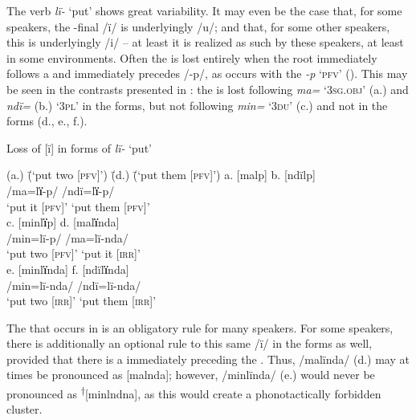   The verb \textit{lï-} ‘put’ shows great variability. It may even be the case that, for some speakers, the -final  /ï/ is underlyingly /u/; and that, for some other speakers, this  is underlyingly /i/ -- at least it is realized as such by these speakers, at least in some environments. Often the  is lost entirely when the root immediately follows a  and immediately precedes /-p/, as occurs with the   \textit{-p} ‘\textsc{pfv}’ (). This may be seen in the contrasts presented in : the  is lost following \textit{ma=} ‘3\textsc{sg.obj}’ (a.) and \textit{ndï=} (b.) ‘3\textsc{pl}’ in the  forms, but not following \textit{min=} ‘\textsc{3du}’ (c.) and not in the  forms (d., e., f.).

\ea%
    \label{ex:phon:91}
          Loss of [ï] in  forms of \textit{lï-} ‘put’\\
\begin{tabbing}
{(a.)} \= {(‘put two [\textsc{pfv]}’)} \= {(d.)} \= {(‘put them [\textsc{pfv]}’)}\kill
{a.} \> {[malp]} \> {b.} \> {[ndïlp]}\\
{ } \> {/ma=l\textbf{ï}-p/ } \> { } \> {/ndï=l\textbf{ï}-p/ }\\
{ } \> {‘put it [\textsc{pfv]}’} \> { } \> {‘put them [\textsc{pfv]}’}\\
{c.} \> {[minl\textbf{ï}p]} \> {d.} \> {[mal\textbf{ï}nda]}\\
{ } \> {/min=lï-p/} \> { } \> {/ma=lï-nda/}\\
{ } \> {‘put two [\textsc{pfv]}’} \> { } \> {‘put it [\textsc{irr]}’}\\
{e.} \> {[minl\textbf{ï}nda]} \> {f.} \> {[ndïl\textbf{ï}nda]}\\
{ } \> {/min=lï-nda/ } \> { } \> {/ndï=lï-nda/}\\
{ } \> {‘put two [\textsc{irr]}’} \> { } \> {‘put them [\textsc{irr]}’}
\end{tabbing}
  \z

The  that occurs in  is an obligatory rule for many speakers. For some speakers, there is additionally an optional rule to  this same  /ï/ in the  forms as well, provided that there is a  immediately preceding the . Thus, /malïnda/ (d.) may at times be pronounced as [malnda]; however, /minlïnda/ (e.) would never be pronounced as \textsuperscript{†}[minlndna], as this would create a  phonotactically forbidden cluster.

